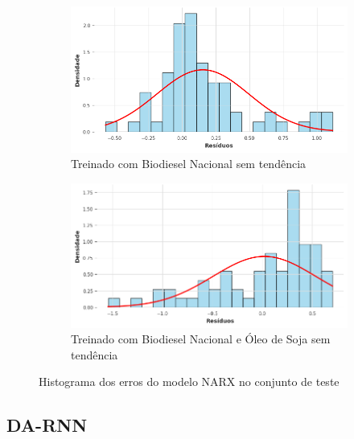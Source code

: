 \begin{figure}[htbp]
	\begin{subfigure}[b]{0.40\textwidth}
		\centering
		\includegraphics[width=\textwidth]{figuras/narx_brasil_detrend_residuals_histogram.png} %
		\caption{Treinado com Biodiesel Nacional sem tendência}
		\label{fig:narx_brasil_detrend_residuals_histogram}
	\end{subfigure}
	\hfill
	\begin{subfigure}[b]{0.40\textwidth}
		\centering
		\includegraphics[width=\textwidth]{figuras/narx_brasil_oil_detrend_residuals_histogram.png} %
		\caption{Treinado com Biodiesel Nacional e Óleo de Soja sem tendência}
		\label{fig:narx_brasil_oil_detrend_residuals_histogram}
	\end{subfigure}

	\caption{Histograma dos erros do modelo \acs{NARX} no conjunto de teste}
	\label{fig:narx_residuals_histogram}
\end{figure}

\subsection{\acs{DA-RNN}}

